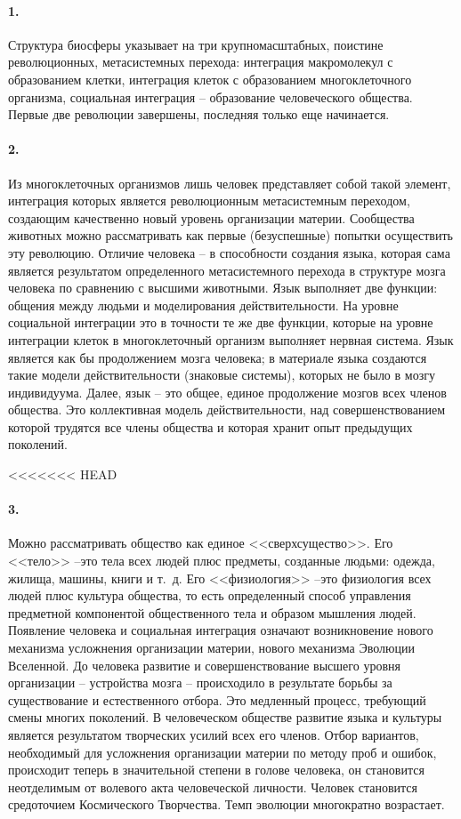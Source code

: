 \documentclass{book}
\begin{document}
\paragraph{1.} Структура биосферы указывает на три крупномасштабных, поистине революционных, метасистемных перехода: интеграция макромолекул с образованием клетки, интеграция клеток с образованием многоклеточного организма, социальная интеграция -- образование человеческого общества. Первые две революции завершены, последняя только еще начинается.

\paragraph{2.} Из многоклеточных организмов лишь человек представляет собой такой элемент, интеграция которых является революционным метасистемным переходом, создающим качественно новый уровень организации материи. Сообщества животных можно рассматривать как первые (безуспешные) попытки осуществить эту революцию. Отличие человека -- в способности создания языка, которая сама является результатом определенного метасистемного перехода в структуре мозга человека по сравнению с высшими животными. Язык выполняет две функции: общения между людьми и моделирования действительности. На уровне социальной интеграции это в точности те же две функции, которые на уровне интеграции клеток в многоклеточный организм выполняет нервная система. Язык является как бы продолжением мозга человека; в материале языка создаются такие модели действительности (знаковые системы), которых не было в мозгу индивидуума. Далее, язык -- это общее, единое продолжение мозгов всех членов общества. Это коллективная модель действительности, над 
совершенствованием которой трудятся все члены общества и которая хранит опыт предыдущих поколений.

<<<<<<< HEAD
\paragraph{3.} Можно рассматривать общество как единое <<сверхсущество>>. Его <<тело>> --это тела всех людей плюс предметы, созданные людьми: одежда, жилища, машины, книги и т.~д. Его <<физиология>> --это физиология всех людей плюс культура  общества, то есть определенный способ управления предметной компонентой общественного тела и образом мышления людей. Появление человека и социальная интеграция означают возникновение нового механизма усложнения организации материи, нового механизма Эволюции Вселенной. До человека развитие и совершенствование высшего уровня организации -- устройства мозга -- происходило в результате борьбы за существование и естественного отбора. Это медленный процесс, требующий смены многих поколений. В человеческом обществе развитие языка и культуры является результатом творческих усилий всех его членов. Отбор вариантов, необходимый для усложнения организации материи по методу проб и ошибок, происходит теперь в значительной степени в голове человека, он становится неотделимым от волевого акта человеческой личности. Человек становится средоточием Космического Творчества. Темп эволюции многократно возрастает.
\end{document}
